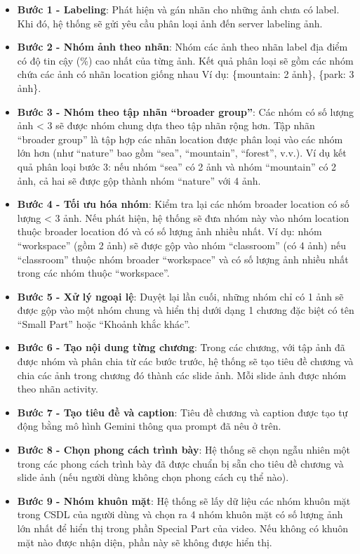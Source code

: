 \begin{itemize}
    \item \textbf{Bước 1 - Labeling}: Phát hiện và gán nhãn cho những ảnh chưa có label. Khi đó, hệ thống sẽ gửi yêu cầu phân loại ảnh đến server labeling ảnh. 
    
    \item \textbf{Bước 2 - Nhóm ảnh theo nhãn}: Nhóm các ảnh theo nhãn label địa điểm có độ tin cậy (\%) cao nhất của từng ảnh. Kết quả phân loại sẽ gồm các nhóm chứa các ảnh có nhãn location giống nhau
    Ví dụ: \{mountain: 2 ảnh\}, \{park: 3 ảnh\}.
    
    \item \textbf{Bước 3 - Nhóm theo tập nhãn ``broader group''}: Các nhóm có số lượng ảnh < 3 sẽ được nhóm chung dựa theo tập nhãn rộng hơn. Tập nhãn ``broader group'' là tập hợp các nhãn location được phân loại vào các nhóm lớn hơn (như ``nature'' bao gồm ``sea'', ``mountain'', ``forest'', v.v.). Ví dụ kết quả phân loại bước 3: nếu nhóm ``sea'' có 2 ảnh và nhóm ``mountain'' có 2 ảnh, cả hai sẽ được gộp thành nhóm ``nature'' với 4 ảnh.
    
    \item \textbf{Bước 4 - Tối ưu hóa nhóm}: Kiểm tra lại các nhóm broader location có số lượng < 3 ảnh. Nếu phát hiện, hệ thống sẽ đưa nhóm này vào nhóm location thuộc broader location đó và có số lượng ảnh nhiều nhất. Ví dụ: nhóm ``workspace'' (gồm 2 ảnh) sẽ được gộp vào nhóm ``classroom'' (có 4 ảnh) nếu ``classroom'' thuộc nhóm broader ``workspace'' và có số lượng ảnh nhiều nhất trong các nhóm thuộc ``workspace''.
    
    \item \textbf{Bước 5 - Xử lý ngoại lệ}: Duyệt lại lần cuối, những nhóm chỉ có 1 ảnh sẽ được gộp vào một nhóm chung và hiển thị dưới dạng 1 chương đặc biệt có tên ``Small Part'' hoặc ``Khoảnh khắc khác''.
    \item \textbf{Bước 6 - Tạo nội dung từng chương}: Trong các chương, với tập ảnh đã được nhóm và phân chia từ các bước trước, hệ thống sẽ tạo tiêu đề chương và chia các ảnh trong chương đó thành các slide ảnh. Mỗi slide ảnh được nhóm theo nhãn activity. 
    \item \textbf{Bước 7 - Tạo tiêu đề và caption}: Tiêu đề chương và caption được tạo tự động bằng mô hình Gemini thông qua prompt đã nêu ở trên. 
    \item \textbf{Bước 8 - Chọn phong cách trình bày}: Hệ thống sẽ chọn ngẫu nhiên một trong các phong cách trình bày đã được chuẩn bị sẵn cho tiêu đề chương và slide ảnh (nếu người dùng không chọn phong cách cụ thể nào).
    \item \textbf{Bước 9 - Nhóm khuôn mặt}: Hệ thống sẽ lấy dữ liệu các nhóm khuôn mặt trong CSDL của người dùng và chọn ra 4 nhóm khuôn mặt có số lượng ảnh lớn nhất để hiển thị trong phần Special Part của video. Nếu không có khuôn mặt nào được nhận diện, phần này sẽ không được hiển thị.
\end{itemize}

